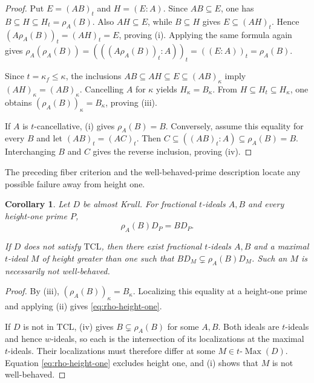 \documentclass[11pt]{amsart}
\newtheorem{corollary}[corollary]{Corollary}
\theoremstyle{definition}
\theoremstyle{remark}
\newcommand{\TCL}{\mathrm{TCL}}
\newcommand{\tMax}{t\text{-}\operatorname{Max}}
\begin{document}
\begin{proof}
Put $E=(AB)_t$ and $H=(E:A)$.  Since $AB\subseteq E$, one has
$B\subseteq H\subseteq H_t=\rho_A(B)$.  Also $AH\subseteq E$, while
$B\subseteq H$ gives $E\subseteq(AH)_t$.  Hence
$(A\rho_A(B))_t=(AH)_t=E$, proving (i).  Applying the same formula again
gives
$\rho_A(\rho_A(B))=(((A\rho_A(B))_t:A))_t=((E:A))_t=\rho_A(B)$.

Since $t=\kappa_f\leq\kappa$, the inclusions
$AB\subseteq AH\subseteq E\subseteq(AB)_\kappa$ imply
$(AH)_\kappa=(AB)_\kappa$.  Cancelling $A$ for $\kappa$ yields
$H_\kappa=B_\kappa$.  From $H\subseteq H_t\subseteq H_\kappa$, one obtains
$(\rho_A(B))_\kappa=B_\kappa$, proving (iii).

If $A$ is $t$-cancellative, (i) gives $\rho_A(B)=B$.  Conversely, assume this
equality for every $B$ and let $(AB)_t=(AC)_t$.  Then
$C\subseteq((AB)_t:A)\subseteq\rho_A(B)=B$.  Interchanging $B$ and $C$
gives the reverse inclusion, proving (iv).
\end{proof}

The preceding fiber criterion and the well-behaved-prime description locate
any possible failure away from height one.

\begin{corollary}\label{cor:residual-support}
Let $D$ be almost Krull.  For fractional $t$-ideals $A,B$ and every
height-one prime $P$,
\begin{equation}\label{eq:rho-height-one}
 \rho_A(B)D_P=BD_P.
\end{equation}

If $D$ does not satisfy $\TCL$, then there exist fractional $t$-ideals
$A,B$ and a maximal $t$-ideal $M$ of height greater than one such that
$BD_M\subsetneq\rho_A(B)D_M$.  Such an $M$ is necessarily not
well-behaved.
\end{corollary}

\begin{proof}
By (iii), $(\rho_A(B))_\kappa=B_\kappa$.  Localizing this
equality at a height-one prime and applying
(ii) gives \eqref{eq:rho-height-one}.

If $D$ is not in $\TCL$, (iv) gives
$B\subsetneq\rho_A(B)$ for some $A,B$.  Both ideals are $t$-ideals and
hence $w$-ideals, so each is the intersection of its localizations at the
maximal $t$-ideals.  Their localizations must therefore differ at some
$M\in\tMax(D)$.  Equation \eqref{eq:rho-height-one} excludes height one,
and (i) shows that $M$ is not well-behaved.
\end{proof}
\end{document}
